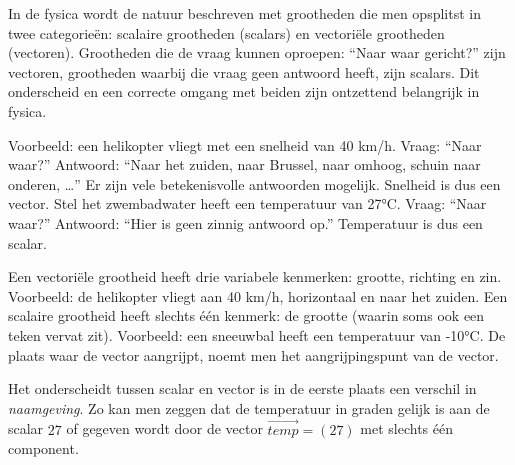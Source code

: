 \documentclass{ximera}
\begin{document}
	\author{Bart Lambregs}
    \xmsource\xmuitleg


In de fysica wordt de natuur beschreven met grootheden die men opsplitst in twee categorieën: scalaire grootheden (scalars) en vectoriële grootheden (vectoren). 
Grootheden die de vraag kunnen oproepen: “Naar waar gericht?” zijn vectoren, grootheden waarbij die vraag geen antwoord heeft, zijn scalars. 
Dit onderscheid en een correcte omgang met beiden zijn ontzettend belangrijk in fysica.


Voorbeeld: een helikopter vliegt met een snelheid van 40 km/h. 
Vraag: “Naar waar?” Antwoord: “Naar het zuiden, naar Brussel, naar omhoog, schuin naar onderen, …” 
Er zijn vele betekenisvolle antwoorden mogelijk. 
Snelheid is dus een vector. 
Stel het zwembadwater heeft een temperatuur van 27°C. 
Vraag: “Naar waar?” Antwoord: “Hier is geen zinnig antwoord op.” 
Temperatuur is dus een scalar.

Een vectoriële grootheid heeft drie variabele kenmerken: grootte, richting en zin. %
Voorbeeld: de helikopter vliegt aan 40 km/h, horizontaal en naar het zuiden. %
Een scalaire grootheid heeft slechts één kenmerk: de grootte (waarin soms ook een teken vervat zit). 
Voorbeeld: een sneeuwbal heeft een temperatuur van -10°C.
De plaats waar de vector aangrijpt, noemt men het aangrijpingspunt van de vector. %


\begin{remark}
Het onderscheidt tussen scalar en vector is in de eerste plaats een verschil in \textit{naamgeving}.
Zo kan men zeggen dat de temperatuur in graden gelijk is aan de scalar \(27\) of gegeven wordt door de vector \(\vec{temp} = (27) \) met slechts één component. 
\end{remark}




	
\end{document}
